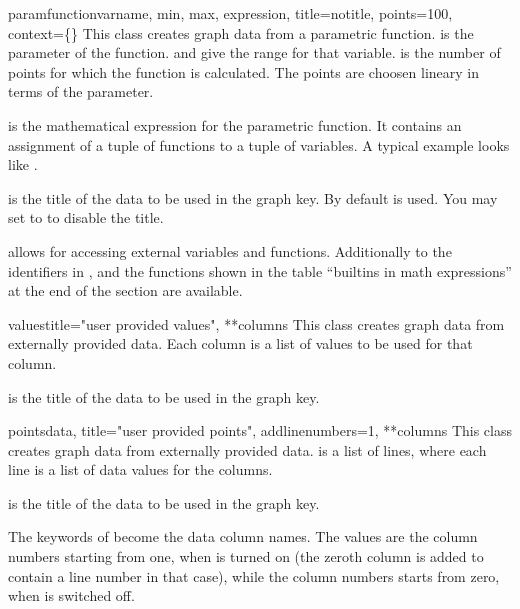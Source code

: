 \begin{classdesc}{paramfunction}{varname, min, max, expression, %
                                 title=notitle, points=100,
                                 context=\{\}}
  This class creates graph data from a parametric function.
   is the parameter of the function.  and
   give the range for that variable.  is the
  number of points for which the function is calculated. The points
  are choosen lineary in terms of the parameter.

   is the mathematical expression for the parametric
  function. It contains an assignment of a tuple of functions to a
  tuple of variables. A typical example looks like
  .

   is the title of the data to be used in the graph key. By
  default  is used. You may set  to
   to disable the title.

   allows for accessing external variables and functions.
  Additionally to the identifiers in ,  and
  the functions shown in the table ``builtins in math expressions'' at
  the end of the section are available.
\end{classdesc} %

\begin{classdesc}{values}{title="user provided values", %
                          **columns}
  This class creates graph data from externally provided data.
  Each column is a list of values to be used for that column.

   is the title of the data to be used in the graph key.
\end{classdesc} %

\begin{classdesc}{points}{data, title="user provided points", %
                          addlinenumbers=1, **columns}
  This class creates graph data from externally provided data.
   is a list of lines, where each line is a list of data
  values for the columns.

   is the title of the data to be used in the graph key.

  The keywords of  become the data column names. The
  values are the column numbers starting from one, when
   is turned on (the zeroth column is added to
  contain a line number in that case), while the column numbers starts
  from zero, when  is switched off.
\end{classdesc} %

